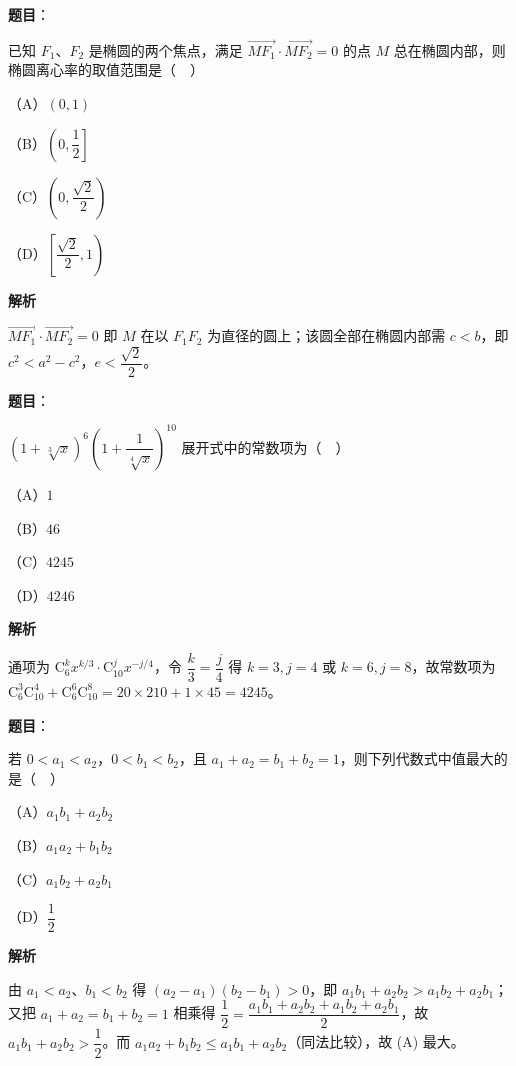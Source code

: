 \begin{answer}

\textbf{题目}：

已知 $F_1$、$F_2$ 是椭圆的两个焦点，满足 $\overrightarrow{MF_1}\cdot\overrightarrow{MF_2}=0$ 的点 $M$ 总在椭圆内部，则椭圆离心率的取值范围是（　）

（A）$(0,1)$

（B）$\left(0,\dfrac12\right]$

（C）$\left(0,\dfrac{\sqrt2}2\right)$

（D）$\left[\dfrac{\sqrt2}2,1\right)$

\textbf{解析}

$\overrightarrow{MF_1}\cdot\overrightarrow{MF_2}=0$ 即 $M$ 在以 $F_1F_2$ 为直径的圆上；该圆全部在椭圆内部需 $c<b$，即 $c^2<a^2-c^2$，$e<\dfrac{\sqrt2}2$。


\end{answer}
\begin{answer}

\textbf{题目}：

$(1+\sqrt[3]x)^6\left(1+\dfrac1{\sqrt[4]x}\right)^{10}$ 展开式中的常数项为（　）

（A）$1$

（B）$46$

（C）$4245$

（D）$4246$

\textbf{解析}

通项为 $\mathrm C_6^k x^{k/3}\cdot\mathrm C_{10}^j x^{-j/4}$，令 $\dfrac k3=\dfrac j4$ 得 $k=3,j=4$ 或 $k=6,j=8$，故常数项为 $\mathrm C_6^3\mathrm C_{10}^4+\mathrm C_6^6\mathrm C_{10}^8=20\times210+1\times45=4245$。


\end{answer}
\begin{answer}

\textbf{题目}：

若 $0<a_1<a_2$，$0<b_1<b_2$，且 $a_1+a_2=b_1+b_2=1$，则下列代数式中值最大的是（　）

（A）$a_1b_1+a_2b_2$

（B）$a_1a_2+b_1b_2$

（C）$a_1b_2+a_2b_1$

（D）$\dfrac12$

\textbf{解析}

由 $a_1<a_2$、$b_1<b_2$ 得 $(a_2-a_1)(b_2-b_1)>0$，即 $a_1b_1+a_2b_2>a_1b_2+a_2b_1$；又把 $a_1+a_2=b_1+b_2=1$ 相乘得 $\dfrac12=\dfrac{a_1b_1+a_2b_2+a_1b_2+a_2b_1}2$，故 $a_1b_1+a_2b_2>\dfrac12$。而 $a_1a_2+b_1b_2\leqslant a_1b_1+a_2b_2$（同法比较），故 (A) 最大。


\end{answer}
